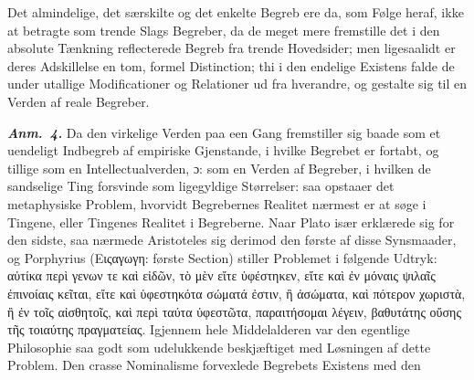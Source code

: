 \documentclass[12pt]{book}
\newcommand{\anm}[1]{\emph{\textbf{Anm.~#1.}}}
\newcommand{\dsi}{\textup{ɔ:}}
\newcommand{\opage}[1]{\marginnote{\footnotesize\textit{[#1]}}}
\begin{document}
Det almindelige, det særskilte og det enkelte Begreb ere da, som Følge heraf,
ikke at betragte som trende Slags Begreber, da de meget mere fremstille det i den
absolute Tænkning reflecterede Begreb fra trende Hovedsider; men ligesaalidt er
deres Adskillelse en tom, formel Distinction; thi i den endelige Existens falde
de under utallige Modificationer og Relationer ud fra hverandre, og gestalte sig
til en Verden af reale Begreber.

\anm{4} Da den virkelige Verden paa een Gang fremstiller sig baade som et
uendeligt Indbegreb af empiriske
\opage{33} Gjenstande, i hvilke Begrebet er fortabt, og tillige som en Intellectualverden,
\dsi{} som en Verden af Begreber, i hvilken de sandselige Ting forsvinde som
ligegyldige Størrelser: saa opstaaer det metaphysiske Problem, hvorvidt
Begrebernes Realitet nærmest er at søge i Tingene, eller Tingenes Realitet i
Begreberne. Naar Plato især erklærede sig for den sidste, saa nærmede Aristoteles
sig derimod den første af disse Synsmaader, og Porphyrius
(Ειςαγωγη: første Section) stiller Problemet i følgende Udtryk:
αὐτίκα περὶ γενων τε καὶ εἰδῶν, τὸ μὲν εἴτε ὑφέστηκεν, εἴτε καὶ ἐν μόναις
ψιλαῖς ἐπινοίαις κεῖται, εἴτε καὶ ὑφεστηκότα σώματά ἐστιν, ἢ ἀσώματα, καὶ
πότερον χωριστὰ, ἢ ἐν τοῖς αἰσθητοῖς, καὶ περὶ ταύτα ὑφεστῶτα, παραιτήσομαι
λέγειν, βαθυτάτης οὔσης τῆς τοιαύτης πραγματείας. Igjennem hele Middelalderen
var den egentlige Philosophie saa godt som udelukkende beskjæftiget med Løsningen
af dette Problem. Den crasse Nominalisme forvexlede Begrebets Existens med den
\end{document}
